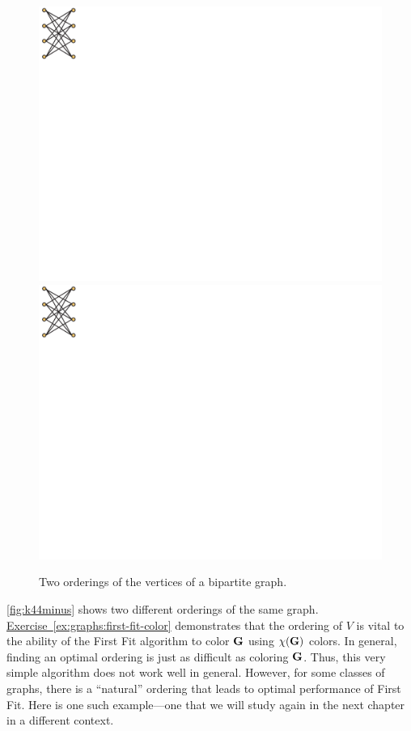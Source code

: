 \begin{figure}
  \includegraphics[clip,viewport=0 324 54 400]{graphs-figs/k44-M}\hspace{.75in}\includegraphics[clip,viewport=0 324 54 400]{graphs-figs/k44-M}
  \caption{Two orderings of the vertices of a bipartite graph.}
  \label{fig:k44minus}
\end{figure}
\autoref{fig:k44minus} shows two different orderings of the same
graph. \hyperref[ex:graphs:first-fit-color]{Exercise~\ref*{ex:graphs:first-fit-color}}
demonstrates that the ordering of $V$ is vital to the ability of the
First Fit algorithm to color $\mathbf{G}$ using $\chi(\mathbf{G})$ colors. In
general, finding an optimal ordering is just as difficult as coloring
$\mathbf{G}$. Thus, this very simple algorithm does not work well in
general. However, for some classes of graphs, there is a ``natural''
ordering that leads to optimal performance of First Fit. Here is one
such example---one that we will study again in the next chapter in a
different context.


